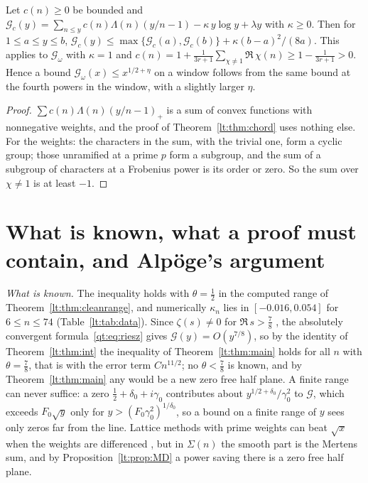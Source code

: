 \begin{proposition}\label{lt:prop:twist}
Let $c(n)\ge0$ be bounded and $\mathcal G_c(y)=\sum_{n\le y}c(n)\Lambda(n)(y/n-1)-\kappa\,y\log y+\lambda y$ with $\kappa\ge0$. Then for $1\le a\le y\le b$, $\mathcal G_c(y)\le\max\{\mathcal G_c(a),\mathcal G_c(b)\}+\kappa(b-a)^2/(8a)$. This applies to $\mathcal G_\omega$ with $\kappa=1$ and $c(n)=1+\frac1{3r+1}\sum_{\chi\ne1}\Re\,\chi(n)\ge1-\frac1{3r+1}>0$. Hence a bound $\mathcal G_\omega(x)\le x^{1/2+\eta}$ on a window follows from the same bound at the fourth powers in the window, with a slightly larger $\eta$.
\end{proposition}

\begin{proof}
$\sum c(n)\Lambda(n)(y/n-1)_+$ is a sum of convex functions with nonnegative weights, and the proof of Theorem~\ref{lt:thm:chord} uses nothing else. For the weights: the characters in the sum, with the trivial one, form a cyclic group; those unramified at a prime $p$ form a subgroup, and the sum of a subgroup of characters at a Frobenius power is its order or zero. So the sum over $\chi\ne1$ is at least $-1$.
\end{proof}

\section{What is known, what a proof must contain, and Alp\"oge's argument}\label{lt:sec:known}
\emph{What is known.} The inequality holds with $\theta=\tfrac12$ in the computed range of Theorem~\ref{lt:thm:cleanrange}, and numerically $\kappa_n$ lies in $[-0.016,0.054]$ for $6\le n\le74$ (Table~\ref{lt:tab:data}). Since $\zeta(s)\ne0$ for $\Re\,s>\frac78$ \cite{OAI26a}, the absolutely convergent formula~\eqref{qt:eq:riesz} gives $\mathcal G(y)=O(y^{7/8})$, so by the identity of Theorem~\ref{lt:thm:int} the inequality of Theorem~\ref{lt:thm:main} holds for all $n$ with $\theta=\frac78$, that is with the error term $Cn^{11/2}$; no $\theta<\frac78$ is known, and by Theorem~\ref{lt:thm:main} any would be a new zero free half plane. A finite range can never suffice: a zero $\tfrac12+\delta_0+i\gamma_0$ contributes about $y^{1/2+\delta_0}/\gamma_0^2$ to $\mathcal G$, which exceeds $F_0\sqrt y$ only for $y>(F_0\gamma_0^2)^{1/\delta_0}$, so a bound on a finite range of $y$ sees only zeros far from the line. Lattice methods with prime weights can beat $\sqrt x$ when the weights are differenced \cite{LWY21}, but in $\Sigma(n)$ the smooth part is the Mertens sum, and by Proposition~\ref{lt:prop:MD} a power saving there is a zero free half plane.

